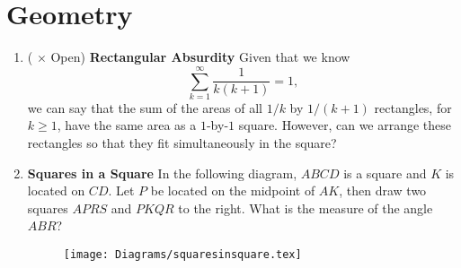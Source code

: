 \documentclass[11pt]{scrartcl}
\begin{document}
\newpage
\section{Geometry}
\begin{enumerate}[label=\textbf{G\arabic*}.]
    \item (\fullchili \hspace{1pt} $\times$ Open) \textbf{Rectangular Absurdity} \newline
    Given that we know
    \[ \sum_{k = 1}^{\infty} \frac{1}{k(k+1)} = 1, \]
    we can say that the sum of the areas of all $1/k$ by $1/(k+1)$ rectangles, for $k \geq 1$, have the same area as a $1$-by-$1$ square. However, can we arrange these rectangles so that they fit simultaneously in the square?

    \item \textbf{Squares in a Square} \newline
    In the following diagram, $ABCD$ is a square and $K$ is located on $CD$. Let $P$ be located on the midpoint of $AK$, then draw two squares $APRS$ and $PKQR$ to the right. What is the measure of the angle $ABR$?
    \begin{figure}[h]
        \centering
        \texttt{[image: Diagrams/squaresinsquare.tex]} %
        \label{fig:squaresinsquare}
    \end{figure} 
\end{enumerate}

\newpage
\end{document}
